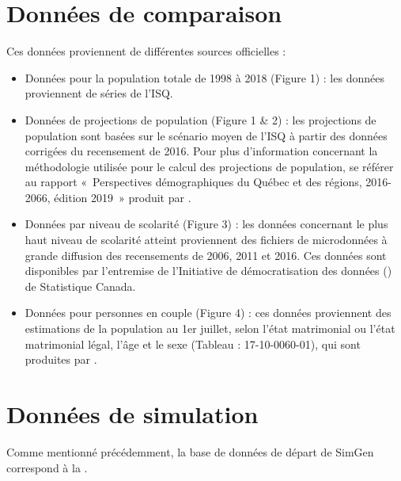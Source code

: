 \documentclass[letterpaper,10pt,french]{sphinxmanual}
\begin{document}
\section{Données de comparaison}
\label{\detokenize{resultats:donnees-de-comparaison}}
Ces données proviennent de différentes sources officielles :
\begin{itemize}
\item {} 
Données pour la population totale de 1998 à 2018 (Figure 1) : les données proviennent de séries de l’ISQ.

\item {} 
Données de projections de population (Figure 1 \& 2) : les projections de population sont basées sur le scénario moyen de l’ISQ à partir des données corrigées du recensement de 2016. Pour plus d’information concernant la méthodologie utilisée pour le calcul des projections de population, se référer au rapport « Perspectives démographiques du Québec et des régions, 2016-2066, édition 2019 » produit par .

\item {} 
Données par niveau de scolarité (Figure 3) : les données concernant le plus haut niveau de scolarité atteint proviennent des fichiers de microdonnées à grande diffusion des recensements de 2006, 2011 et 2016. Ces données sont disponibles par l’entremise de l’Initiative de démocratisation des données () de Statistique Canada.

\item {} 
Données pour personnes en couple (Figure 4) : ces données proviennent des estimations de la population au 1er juillet, selon l’état matrimonial ou l’état matrimonial légal, l’âge et le sexe (Tableau : 17-10-0060-01), qui sont produites par .

\end{itemize}


\section{Données de simulation}
\label{\detokenize{resultats:donnees-de-simulation}}
Comme mentionné précédemment, la base de données de départ de SimGen correspond à la .
\end{document}
